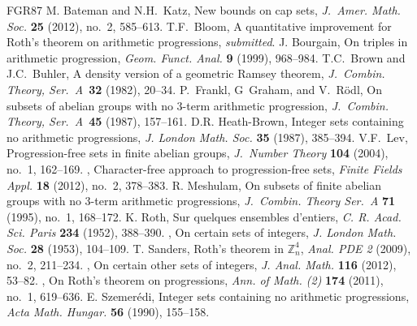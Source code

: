 \documentclass[12pt,reqno]{amsart}
\newcommand{\Z}{{\mathbb Z}}
\newcommand{\<}{\langle}
\renewcommand{\>}{\rangle}
\theoremstyle{remark}
\begin{document}
\vfill
\begin{thebibliography}{FGR87}
  {\sc M. Bateman} and {\sc N.H.~Katz},
  New bounds on cap sets,
  \emph{J.~Amer. Math. Soc.} {\bf 25} (2012), no.~2, 585--613.
  {\sc T.F.~Bloom},
  A quantitative improvement for Roth's theorem on arithmetic progressions,
  \emph{submitted}.
  {\sc J. Bourgain},
  On triples in arithmetic progression,
  \emph{Geom. Funct. Anal.} {\bf 9} (1999), 968--984.
 {\sc T.C.~Brown} and {\sc J.C.~Buhler},
  A density version of a geometric Ramsey theorem,
  \emph{J.~Combin. Theory, Ser.~A}~{\bf 32} (1982), 20--34.
 {\sc P.~Frankl, G~Graham}, and {\sc V.~R\"odl},
  On subsets of abelian groups with no $3$-term arithmetic progression,
  \emph{J.~Combin. Theory, Ser.~A}~{\bf 45} (1987), 157--161.
  {\sc D.R. Heath-Brown},
  Integer sets containing no arithmetic progressions,
  \emph{J. London Math. Soc.} {\bf 35} (1987), 385--394.
  {\sc V.F.~Lev},
  Progression-free sets in finite abelian groups,
  \emph{J.~Number Theory} {\bf 104} (2004), no.~1, 162--169.
  \bysame,
  Character-free approach to progression-free sets,
  \emph{Finite Fields Appl.} {\bf 18} (2012), no.~2, 378--383.
  {\sc R. Meshulam},
  On subsets of finite abelian groups with no 3-term arithmetic progressions,
  \emph{J.~Combin. Theory Ser.~A} {\bf 71} (1995), no.~1, 168--172.
  {\sc K. Roth},
  Sur quelques ensembles d'entiers,
  \emph{C. R. Acad. Sci. Paris} {\bf 234} (1952), 388--390.
  \bysame,
  On certain sets of integers,
  \emph{J. London Math. Soc.} {\bf 28} (1953), 104--109.
  {\sc T. Sanders},
  Roth's theorem in $\Z_n^4$,
  \emph{Anal. PDE 2} (2009), no.~2, 211--234.
  \bysame,
  On certain other sets of integers,
  \emph{J. Anal. Math.} {\bf 116} (2012), 53--82.
  \bysame,
  On Roth's theorem on progressions,
  \emph{Ann. of Math. (2)} {\bf 174} (2011), no.~1, 619--636.
  {\sc E. Szemer\'edi},
  Integer sets containing no arithmetic progressions,
  \emph{Acta Math. Hungar.} {\bf 56} (1990), 155--158.
\end{thebibliography}

\bigskip
\end{document}

